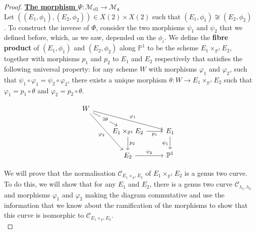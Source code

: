 \documentclass{amsart}
\newcommand{\calC}{\mathcal{C}}
\newcommand{\calM}{\mathcal{M}}
\newcommand{\nor}{\calC_{E_1 \times_{\mathbb{P}^1} E_2}}
\newcommand{\mell}{\mathcal{M}_{\text{ell}}}
\numberwithin{equation}{section}
\theoremstyle{definition}
\theoremstyle{remark}
\begin{document}
\begin{proof}
\underline{\textbf{The morphism $\Psi:\mell\rightarrow\calM$.}}\\

Let $((E_1,\phi_1),(E_2,\phi_2))\in X(2)\times X(2)$ such that $(E_1,\phi_1)\not\cong(E_2,\phi_2)$. To construct the inverse of $\Phi$, consider the two morphisms $\psi_1$ and $\psi_2$ that we defined before, which, as we saw, depended on the $\phi_i$.  We define the \textbf{fibre product} of $(E_1,\phi_1)$ and $(E_2,\phi_2)$ along $\mathbb{P}^1$ to be the scheme $E_1\times_{\mathbb{P}^1}E_2$, together with morphisms $p_1$ and $p_2$ to $E_1$ and $E_2$ respectively that satisfies the following universal property: for any scheme $W$
with morphisms $\varphi_1$ and $\varphi_2$, such that $\psi_1\circ\varphi_1=\psi_2\circ\varphi_2$, there exists a unique morphism $\theta:W\rightarrow E_1\times_{\mathbb{P}^1}E_2$ such that $\varphi_1=p_1\circ\theta$ and $\varphi_2=p_2\circ\theta$.

\[\begin{tikzcd}
W \arrow[rd, "\exists\theta" description] \arrow[rrd, "\varphi_1"] \arrow[rdd, "\varphi_2"'] &                                                                &                          \\
                                                                                      & E_1\times_{\mathbb{P}^1}E_2 \arrow[r, "p_1"'] \arrow[d, "p_2"] & E_1 \arrow[d, "\psi_1"'] \\
                                                                                      & E_2 \arrow[r, "\psi_2"]                                        & \mathbb{P}^1            
\end{tikzcd}\vspace{10pt}\]

We will prove that the normalisation $\nor$ of $E_1\times_{\mathbb{P}^1}E_2$ is a genus two curve. To do this, we will show that for any $E_1$ and $E_2$, there is a genus two curve $\calC_{\lambda_1,\lambda_2}$ and morphisms $\varphi_1$ and $\varphi_2$ making the diagram commutative and use the information that we know about the ramification of the morphisms to show that this curve is isomorphic to $\nor$.\\


\end{proof}
\end{document}
